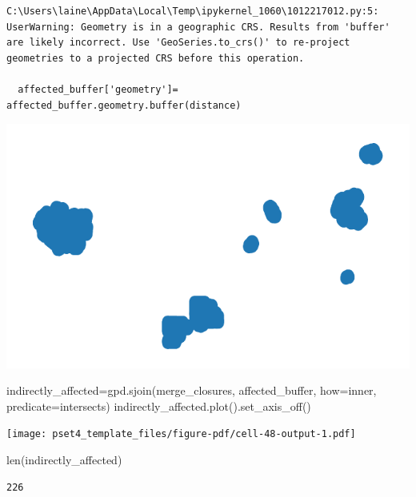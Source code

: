 \documentclass[
  letterpaper,
  DIV=11,
  numbers=noendperiod]{scrartcl}
\newenvironment{Shaded}{\begin{snugshade}}{\end{snugshade}}
\newcommand{\BuiltInTok}[1]{\textcolor[rgb]{0.00,0.23,0.31}{#1}}
\newcommand{\NormalTok}[1]{\textcolor[rgb]{0.00,0.23,0.31}{#1}}
\newcommand{\OperatorTok}[1]{\textcolor[rgb]{0.37,0.37,0.37}{#1}}
\newcommand{\StringTok}[1]{\textcolor[rgb]{0.13,0.47,0.30}{#1}}
\begin{document}
\begin{verbatim}
C:\Users\laine\AppData\Local\Temp\ipykernel_1060\1012217012.py:5: UserWarning: Geometry is in a geographic CRS. Results from 'buffer' are likely incorrect. Use 'GeoSeries.to_crs()' to re-project geometries to a projected CRS before this operation.

  affected_buffer['geometry']= affected_buffer.geometry.buffer(distance)
\end{verbatim}

\includegraphics{pset4_template_files/figure-pdf/cell-47-output-2.pdf}

\begin{Shaded}
\begin{Highlighting}[]
\NormalTok{indirectly\_affected}\OperatorTok{=}\NormalTok{gpd.sjoin(merge\_closures, affected\_buffer, how}\OperatorTok{=}\StringTok{\textquotesingle{}inner\textquotesingle{}}\NormalTok{, predicate}\OperatorTok{=}\StringTok{\textquotesingle{}intersects\textquotesingle{}}\NormalTok{)}
\NormalTok{indirectly\_affected.plot().set\_axis\_off()}
\end{Highlighting}
\end{Shaded}

\texttt{[image: pset4\_template\_files/figure-pdf/cell-48-output-1.pdf]}

\begin{Shaded}
\begin{Highlighting}[]
\BuiltInTok{len}\NormalTok{(indirectly\_affected)}
\end{Highlighting}
\end{Shaded}

\begin{verbatim}
226
\end{verbatim}
\end{document}
